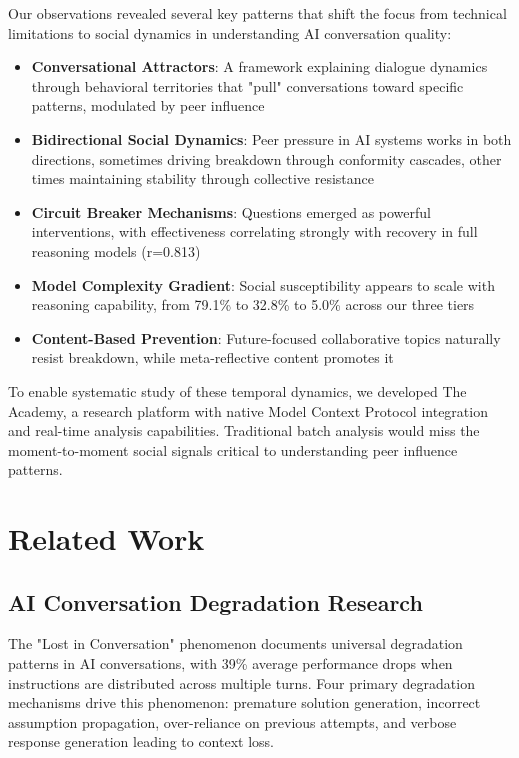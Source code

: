 \documentclass[11pt,letterpaper]{article}
\newcommand{\theacademy}{The Academy}
\newcommand{\exponedataPeerPressurePercentage}{79.1\%}
\newcommand{\exponedataQuestionCorrelation}{0.813}
\newcommand{\exptwoPeerPressurePercentage}{32.8\%}
\newcommand{\expthreePeerPressurePercentage}{5.0\%}
\begin{document}
Our observations revealed several key patterns that shift the focus from technical limitations to social dynamics in understanding AI conversation quality:
\begin{itemize}
    \item \textbf{Conversational Attractors}: A framework explaining dialogue dynamics through behavioral territories that "pull" conversations toward specific patterns, modulated by peer influence
    \item \textbf{Bidirectional Social Dynamics}: Peer pressure in AI systems works in both directions, sometimes driving breakdown through conformity cascades, other times maintaining stability through collective resistance
    \item \textbf{Circuit Breaker Mechanisms}: Questions emerged as powerful interventions, with effectiveness correlating strongly with recovery in full reasoning models (r=\exponedataQuestionCorrelation{})
    \item \textbf{Model Complexity Gradient}: Social susceptibility appears to scale with reasoning capability, from \exponedataPeerPressurePercentage{} to \exptwoPeerPressurePercentage{} to \expthreePeerPressurePercentage{} across our three tiers
    \item \textbf{Content-Based Prevention}: Future-focused collaborative topics naturally resist breakdown, while meta-reflective content promotes it
\end{itemize}

To enable systematic study of these temporal dynamics, we developed \theacademy{}, a research platform with native Model Context Protocol integration and real-time analysis capabilities. Traditional batch analysis would miss the moment-to-moment social signals critical to understanding peer influence patterns.

\section{Related Work}

\subsection{AI Conversation Degradation Research}

The "Lost in Conversation" phenomenon \citep{laban2025lost} documents universal degradation patterns in AI conversations, with 39\% average performance drops when instructions are distributed across multiple turns. Four primary degradation mechanisms drive this phenomenon: premature solution generation, incorrect assumption propagation, over-reliance on previous attempts, and verbose response generation leading to context loss.
\end{document}
